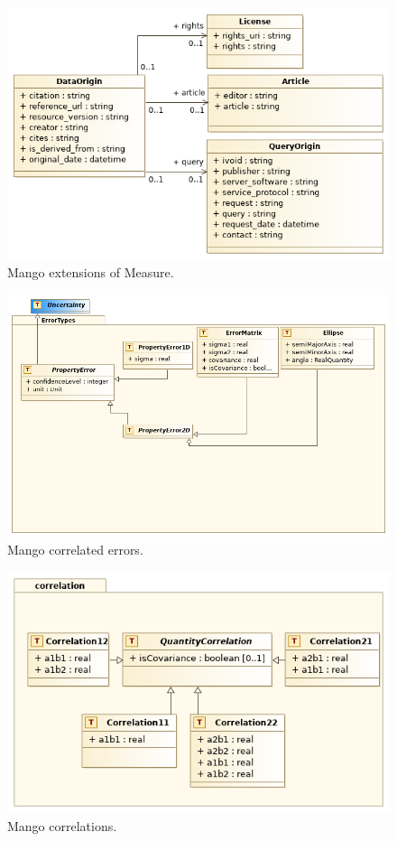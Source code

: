 \documentclass[11pt,a4paper]{ivoa}
\begin{document}
\begin{figure}
  \includegraphics[width=1.0\textwidth]{../model/MangoDataOrigin.png}
  \caption{Mango extensions of Measure.}
  \label{fig:dataOrigin}
\end{figure}

\begin{figure}
  \includegraphics[width=1.0\textwidth]{../model/mangoErrorTypes.png}
  \caption{Mango correlated errors.}
  \label{fig:errors}
\end{figure}

\begin{figure}
  \includegraphics[width=1.0\textwidth]{../model/correlation.png}
  \caption{Mango correlations.}
  \label{fig:correlation}
\end{figure}
\end{document}
